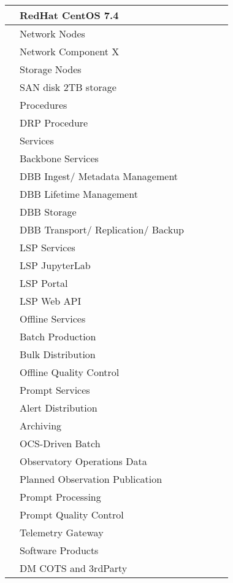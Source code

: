 \begin{longtable}{|p{}|p{}|p{}|p{}|p{}|p{}|}
 &  RedHat CentOS 7.4 &  &  &  & \\ \hline
 &  Network Nodes &  &  &  & \\ \hline
 &  Network Component X &  &  &  & \\ \hline
 &  Storage Nodes &  &  &  & \\ \hline
 &  SAN disk 2TB storage &  &  &  & \\ \hline
 &  Procedures &  &  &  & \\ \hline
 &  DRP Procedure &  &  &  & \\ \hline
 &  Services &  &  &  & \\ \hline
 &  Backbone Services &  &  &  & \\ \hline
 &  DBB Ingest/ Metadata Management &  &  &  & \\ \hline
 &  DBB Lifetime Management &  &  &  & \\ \hline
 &  DBB Storage &  &  &  & \\ \hline
 &  DBB Transport/ Replication/ Backup &  &  &  & \\ \hline
 &  LSP Services &  &  &  & \\ \hline
 &  LSP JupyterLab &  &  &  & \\ \hline
 &  LSP Portal &  &  &  & \\ \hline
 &  LSP Web API &  &  &  & \\ \hline
 &  Offline Services &  &  &  & \\ \hline
 &  Batch Production &  &  &  & \\ \hline
 &  Bulk Distribution &  &  &  & \\ \hline
 &  Offline Quality Control &  &  &  & \\ \hline
 &  Prompt Services &  &  &  & \\ \hline
 &  Alert Distribution &  &  &  & \\ \hline
 &  Archiving &  &  &  & \\ \hline
 &  OCS-Driven Batch &  &  &  & \\ \hline
 &  Observatory Operations Data &  &  &  & \\ \hline
 &  Planned Observation Publication &  &  &  & \\ \hline
 &  Prompt Processing &  &  &  & \\ \hline
 &  Prompt Quality Control &  &  &  & \\ \hline
 &  Telemetry Gateway &  &  &  & \\ \hline
 &  Software Products &  &  &  & \\ \hline
 &  DM COTS and 3rdParty &  &  &  & \\ \hline

\end{longtable}
